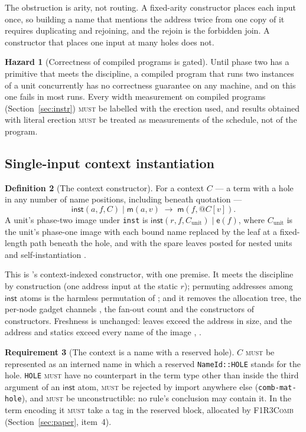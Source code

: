 \documentclass[11pt,a4paper]{article}
\makeatletter
\newcommand{\code}[1]{\texttt{#1}}
\newcommand{\Comb}{\textsc{F1R3Comb}}
\newcommand{\MUST}{\textsc{must}}
\newcommand{\quo}[1]{@#1}
\newcommand{\red}{\longrightarrow}
\newcommand{\mm}{\mathsf{m}}
\newcommand{\ev}{\mathsf{e}}
\theoremstyle{definition}
\newtheorem{definition}{Definition}[section]
\newtheorem{requirement}[definition]{Requirement}
\newtheorem{hazard}[definition]{Hazard}
\theoremstyle{plain}
\newcommand{\inst}{\mathsf{inst}}
\makeatother
\begin{document}
The obstruction is arity, not routing. A fixed-arity constructor places each
input once, so building a name that mentions the address twice from one copy
of it requires duplicating and rejoining, and the rejoin is the forbidden
join. A constructor that places one input at many holes does not.

\begin{hazard}[Correctness of compiled programs is gated]\label{haz:gate}
Until phase two has a primitive that meets the discipline, a compiled program
that runs two instances of a unit concurrently has no correctness guarantee on
any machine, and on this one fails in most runs. Every width measurement on
compiled programs (Section~\ref{sec:instr}) \MUST{} be labelled with the
erection used, and results obtained with literal erection \MUST{} be treated
as measurements of the schedule, not of the program.
\end{hazard}

\subsection{Single-input context instantiation}\label{sec:inst}

\begin{definition}[The context constructor]\label{def:inst}
For a context $C$ --- a term with a hole in any number of name positions,
including beneath quotation ---
\[
  \inst(a,f,C) \mid \mm(a,v) \;\red\; \mm(f,\quo{C[v]}).
\]
A unit's phase-two image under \code{inst} is $\inst(r,f,C_{\mathrm{unit}})
\mid \ev(f)$, where $C_{\mathrm{unit}}$ is the unit's phase-one image with
each bound name replaced by the leaf at a fixed-length path beneath the hole,
and with the spare leaves posted for nested units and self-instantiation
\cite[Req.~5.11]{combspec}.
\end{definition}

This is \cite[Rem.~3.14]{draft3}'s context-indexed constructor, with one
premise. It meets the discipline by construction (one address input at the
static $r$); permuting addresses among $\inst$ atoms is the harmless
permutation of \cite[Lem.~6.11]{draft3}; and it removes the allocation tree,
the per-node gadget channels \cite[Req.~5.9]{combspec}, the fan-out count
\cite[Req.~5.12]{combspec} and the constructors of constructors. Freshness is
unchanged: leaves exceed the address in size, and the address and statics
exceed every name of the image \cite[Lem.~6.14]{draft3},
\cite[Req.~5.22]{combspec}.

\begin{requirement}[The context is a name with a reserved hole]\label{req:hole}
$C$ \MUST{} be represented as an interned name in which a reserved
\code{NameId::HOLE} stands for the hole. \code{HOLE} \MUST{} have no
counterpart in the term type other than inside the third argument of an
$\inst$ atom, \MUST{} be rejected by import anywhere else
(\code{comb-mat-hole}), and \MUST{} be unconstructible: no rule's conclusion
may contain it. In the term encoding it \MUST{} take a tag in the reserved
block, allocated by \Comb{} (Section~\ref{sec:paper}, item~4).
\end{requirement}
\end{document}
